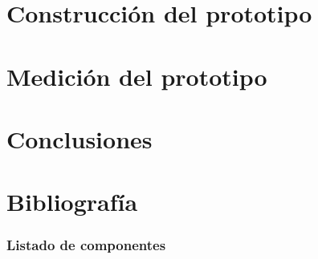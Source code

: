 \documentclass[10pt,a4paper]{article}
\begin{document}
	\part{Construcción del prototipo}\label{part:construccion}
%		

	\part{Medición del prototipo}\label{part:mediciones}
%		

	\part{Conclusiones}\label{part:conclusiones}
		

	\part{Bibliografía}\label{part:bibliografia}
		

	\appendix
	\section{Listado de componentes}
		
\end{document}
